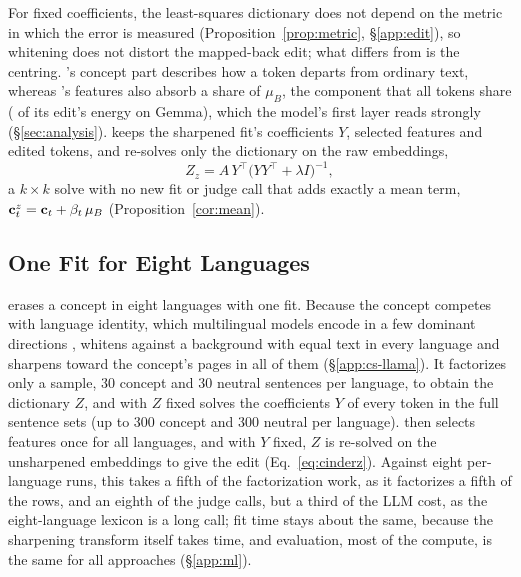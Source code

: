 For fixed coefficients, the least-squares dictionary does not depend on the metric in which the error is measured (Proposition~\ref{prop:metric}, \S\ref{app:edit}), so whitening does not distort the mapped-back edit; what differs from \ember{} is the centring.
\cinder{}'s concept part describes how a token departs from ordinary text, whereas \ember{}'s features also absorb a share of $\mu_B$, the component that all tokens share ( of its edit's energy on Gemma), which the model's first layer reads strongly (\S\ref{sec:analysis}).
\cinderz{} keeps the sharpened fit's coefficients $Y$, selected features and edited tokens, and re-solves only the dictionary on the raw embeddings,
\begin{equation}
  Z_{z} = A\,Y^{\top}\big(Y Y^{\top} + \lambda I\big)^{-1},
  \label{eq:cinderz}
\end{equation}
a $k \times k$ solve with no new fit or judge call that adds exactly a mean term, $\mathbf{c}^{z}_t = \mathbf{c}_t + \beta_t\,\mu_B$ (Proposition~\ref{cor:mean}).

\subsection{One Fit for Eight Languages}
\label{sec:ml}

\cinder{} erases a concept in eight languages with one fit.
Because the concept competes with language identity, which multilingual models encode in a few dominant directions \citep{chang2022geometry,libovicky2020language}, \cinder{} whitens against a background with equal text in every language and sharpens toward the concept's pages in all of them (\S\ref{app:cs-llama}).
It factorizes only a sample, 30 concept and 30 neutral sentences per language, to obtain the dictionary $Z$, and with $Z$ fixed solves the coefficients $Y$ of every token in the full sentence sets (up to 300 concept and 300 neutral per language).
\twj{} then selects features once for all languages, and with $Y$ fixed, $Z$ is re-solved on the unsharpened embeddings to give the \cinderz{} edit (Eq.~\ref{eq:cinderz}).
Against eight per-language \ember{} runs, this takes a fifth of the factorization work, as it factorizes a fifth of the rows, and an eighth of the judge calls, but a third of the LLM cost, as the eight-language lexicon is a long call; fit time stays about the same, because the sharpening transform itself takes time, and evaluation, most of the compute, is the same for all approaches (\S\ref{app:ml}).
